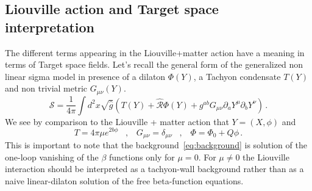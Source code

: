 \documentclass[a4paper]{article}
\def\sp{\;\;\;,\;\;\;}
\begin{document}
\subsection{Liouville action and Target space interpretation} The different terms appearing in the Liouville+matter action have a meaning in terms of Target space fields. Let's recall the general form of the generalized non linear sigma model in presence of a dilaton $\Phi(Y)$, a Tachyon condensate $T(Y)$ and non trivial metric $G_{\mu \nu}(Y)$.
\begin{equation}
  \mathcal{S} = \frac{1}{4\pi}\int d^2x \sqrt{\hat{g}}\left(T(Y)+\hat{\mathcal{R}}\Phi(Y)+g^{ab}G_{\mu \nu}\partial_a Y^\mu \partial_b Y^\nu\right)\,.
\end{equation}
We see by comparison to the Liouville + matter action that $Y = (X,\phi)$ and
\begin{equation}\label{eq:background}
  T = 4\pi \mu e^{2b \phi}\sp G_{\mu \nu} = \delta_{\mu \nu}\sp  \Phi = \Phi_0+Q\phi\,. 
\end{equation}
This is important to note that the background~\eqref{eq:background} is solution of the one-loop vanishing of the $\beta$ functions only for $\mu=0$. For $\mu\neq0$ the Liouville interaction should be interpreted as a tachyon-wall background rather than as a naive linear-dilaton solution of the free beta-function equations.
\end{document}

